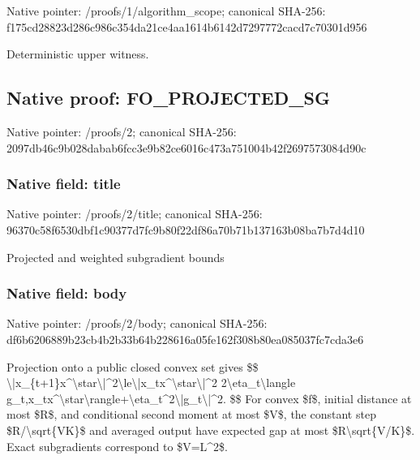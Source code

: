 \documentclass[10pt,a4paper]{article}
\begin{document}
Native pointer: /proofs/1/algorithm\_scope; canonical SHA-256: f175cd28823d286c986c354d\allowbreak{}a21ce4aa1614b6142d729777\allowbreak{}2cacd7c70301d956


Deterministic upper witness.


\subsection{Native proof: FO\_PROJECTED\_SG}


Native pointer: /proofs/2; canonical SHA-256: 2097db46c9b028dabab6fcc3\allowbreak{}e9b82ce6016c473a751004b4\allowbreak{}2f2697573084d90c



\subsubsection{Native field: title}


Native pointer: /proofs/2/title; canonical SHA-256: 96370c58f6530dbf1c90377d\allowbreak{}7fc9b80f22df86a70b71b137\allowbreak{}163b08ba7b7d4d10


Projected and weighted subgradient bounds


\subsubsection{Native field: body}


Native pointer: /proofs/2/body; canonical SHA-256: df6b6206889b23cb4b2b33b6\allowbreak{}4b228616a05fe162f308b80e\allowbreak{}a085037fc7cda3e6


Projection onto a public closed convex set gives
\$\$
\textbackslash{}|x\_\{t+1\}x\textasciicircum{}\textbackslash{}star\textbackslash{}|\textasciicircum{}2\textbackslash{}le\allowbreak{}\textbackslash{}|x\_tx\textasciicircum{}\textbackslash{}star\textbackslash{}|\textasciicircum{}2
2\textbackslash{}eta\_t\textbackslash{}langle g\_t,x\_tx\textasciicircum{}\textbackslash{}star\textbackslash{}rangle+\textbackslash{}\allowbreak{}eta\_t\textasciicircum{}2\textbackslash{}|g\_t\textbackslash{}|\textasciicircum{}2.
\$\$
For convex \$f\$, initial distance at most \$R\$, and conditional second moment at most \$V\$, the constant step \$R/\textbackslash{}sqrt\{VK\}\$ and averaged output have expected gap at most \$R\textbackslash{}sqrt\{V/K\}\$. Exact subgradients correspond to \$V=L\textasciicircum{}2\$.
\end{document}
